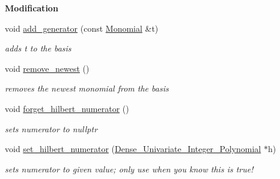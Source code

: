 \begin{Indent}\textbf{ Modification}\par
\begin{DoxyCompactItemize}
\item 
\mbox{\label{class_monomial___ideal_a10135daadd19fbd37cde2c1109eaf26d}} 
void \hyperlink{class_monomial___ideal_a10135daadd19fbd37cde2c1109eaf26d}{add\+\_\+generator} (const \hyperlink{class_monomial}{Monomial} \&t)
\begin{DoxyCompactList}\small\item\em adds {\ttfamily t} to the basis \end{DoxyCompactList}\item 
\mbox{\label{class_monomial___ideal_a5410d31236ca04dfca3fe27acb7553f4}} 
void \hyperlink{class_monomial___ideal_a5410d31236ca04dfca3fe27acb7553f4}{remove\+\_\+newest} ()
\begin{DoxyCompactList}\small\item\em removes the newest monomial from the basis \end{DoxyCompactList}\item 
\mbox{\label{class_monomial___ideal_a5653fee1985ec45e11c594d7de53385b}} 
void \hyperlink{class_monomial___ideal_a5653fee1985ec45e11c594d7de53385b}{forget\+\_\+hilbert\+\_\+numerator} ()
\begin{DoxyCompactList}\small\item\em sets numerator to {\ttfamily nullptr} \end{DoxyCompactList}\item 
\mbox{\label{class_monomial___ideal_ab0c510ed85328199cce722831143165e}} 
void \hyperlink{class_monomial___ideal_ab0c510ed85328199cce722831143165e}{set\+\_\+hilbert\+\_\+numerator} (\hyperlink{class_dense___univariate___integer___polynomial}{Dense\+\_\+\+Univariate\+\_\+\+Integer\+\_\+\+Polynomial} $\ast$h)
\begin{DoxyCompactList}\small\item\em sets numerator to given value; only use when you know this is true! \end{DoxyCompactList}\end{DoxyCompactItemize}
\end{Indent}
